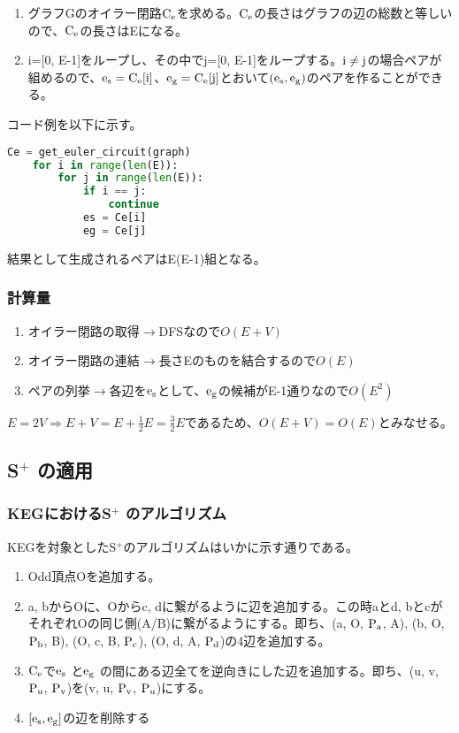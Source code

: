 \documentclass[11pt,a4j]{jarticle}
\newcommand{\splus}{S${}^\text{+}$}
\newcommand{\f}[1]{$\rm{#1}$} %
\newcommand{\ra }{$\rightarrow$}
\newcommand{\tops}[2]{\texorpdfstring{#1}{#2}} %
\begin{document}
\begin{enumerate}
    \item グラフGのオイラー閉路\f{C_e}を求める。\f{C_e}の長さはグラフの辺の総数と等しいので、\f{C_e}の長さはEになる。
    \item i=[0, E-1]をループし、その中でj=[0, E-1]をループする。\f{i\neq j}の場合ペアが組めるので、\f{e_s=C_e[i]}、\f{e_g=C_e[j]}とおいて\f{(e_s, e_g)}のペアを作ることができる。
\end{enumerate}

コード例を以下に示す。

\begin{center}
    \begin{lstlisting}[language=Python]
    Ce = get_euler_circuit(graph)
    for i in range(len(E)):
        for j in range(len(E)):
            if i == j:
                continue
            es = Ce[i]
            eg = Ce[j]
    \end{lstlisting}
\end{center}
結果として生成されるペアはE(E-1)組となる。

\subsubsection{計算量}
\begin{enumerate}
    \item オイラー閉路の取得\ra DFSなので$O(E+V)$
    \item オイラー閉路の連結\ra 長さEのものを結合するので$O(E)$
    \item ペアの列挙\ra 各辺を\f{e_s}として、\f{e_g}の候補がE-1通りなので$O(E^2)$
\end{enumerate}
$E=2V \Rightarrow E+V=E+\frac{1}{2}E=\frac{3}{2}E$であるため、$O(E+V)=O(E)$とみなせる。

\subsection{\tops{\splus}{S+} の適用}

\subsubsection{KEGにおける\tops{\splus}{S+} のアルゴリズム}
KEGを対象とした\splus のアルゴリズムはいかに示す通りである。
\begin{enumerate}
    \item Odd頂点Oを追加する。
    \item a, bからOに、Oからc, dに繋がるように辺を追加する。この時aとd, bとcがそれぞれOの同じ側(A/B)に繋がるようにする。即ち、(a, O, \f{P_a}, A), (b, O, \f{P_b}, B), (O, c, B, \f{P_c}), (O, d, A, \f{P_d})の4辺を追加する。
    \item \f{C_e}で\f{e_s} と\f{e_g} の間にある辺全てを逆向きにした辺を追加する。即ち、(u, v, \f{P_u}, \f{P_v})を(v, u, \f{P_v}, \f{P_u})にする。
    \item $[\rm{e_s}, \rm{e_g}]$の辺を削除する
\end{enumerate}
\end{document}
